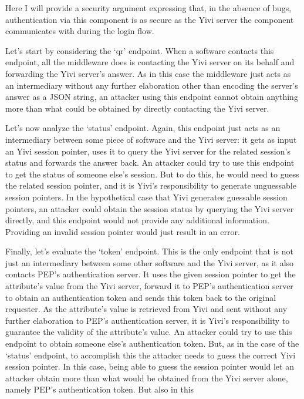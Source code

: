 \documentclass{report}
\begin{document}
Here I will provide a security argument expressing that, in the absence of bugs, authentication via this component is as secure as the Yivi server the component communicates with
during the login flow. \par
Let's start by considering the \enquote*{qr} endpoint. When a software contacts this endpoint, all the middleware does is contacting the Yivi server on its
behalf and forwarding the Yivi server's answer. As in this case the middleware just acts as an intermediary without any further elaboration other than encoding the server's answer as
a JSON string, an attacker using this endpoint cannot obtain anything more than what could be obtained by directly contacting the Yivi server. \par
Let's now analyze the \enquote*{status} endpoint. Again, this endpoint just acts as an intermediary between some piece of software and the Yivi server: it gets as input an Yivi
session pointer, uses it to query the Yivi server for the related session's status and forwards the answer back. An attacker could try to use this endpoint to get the status of
someone else's session. But to do this, he would need to guess the related session pointer, and it is Yivi's responsibility to generate unguessable session pointers. In the
hypothetical case that Yivi generates guessable session pointers, an attacker could obtain the session status by querying the Yivi server directly, and this endpoint would not
provide any additional information. Providing an invalid session pointer would just result in an error. \par
Finally, let's evaluate the \enquote*{token} endpoint. This is the only endpoint that is not just an intermediary between some other software and the Yivi server, as it also
contacts PEP's authentication server. It uses the given session pointer to get the attribute's value from the Yivi server, forward it to PEP's authentication server to obtain an
authentication token and sends this token back to the original requester. As the attribute's value is retrieved from Yivi and sent without any further elaboration to PEP's
authentication server, it is Yivi's responsibility to guarantee the validity of the attribute's value. An attacker could try to use this endpoint to obtain someone else's
authentication token. But, as in the case of the \enquote*{status} endpoint, to accomplish this the attacker needs to guess the correct Yivi session pointer. In this case, being
able to guess the session pointer would let an attacker obtain more than what would be obtained from the Yivi server alone, namely PEP's authentication token. But also in this
\end{document}
